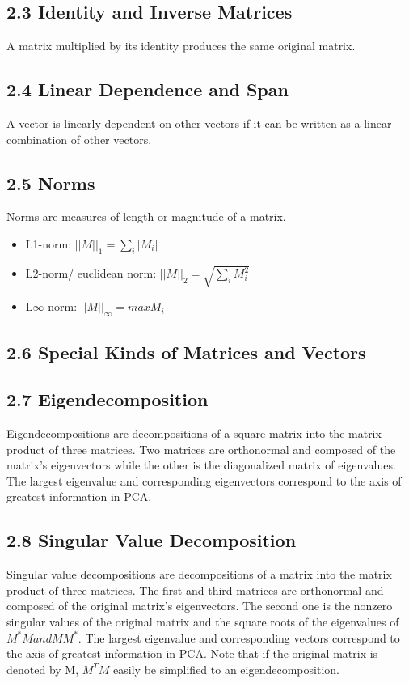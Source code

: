 \documentclass[a4paper]{report}
\begin{document}
\subsection{2.3 Identity and Inverse Matrices}
A matrix multiplied by its identity produces the same original matrix.

\subsection{2.4 Linear Dependence and Span}
A vector is linearly dependent on other vectors if it can be written as a linear combination of other vectors.

\subsection{2.5 Norms}
Norms are measures of length or magnitude of a matrix.
\begin{itemize}
    \item L1-norm: $||M||_1=\sum_i |M_i|$
    \item L2-norm/ euclidean norm: $||M||_2=\sqrt{\sum_i M_i^2}$
    \item L$\infty$-norm: $||M||_\infty=max{M_i}$
\end{itemize}

\subsection{2.6 Special Kinds of Matrices and Vectors}
\subsection{2.7 Eigendecomposition}
Eigendecompositions are decompositions of a square matrix into the matrix product of three matrices. Two matrices are orthonormal and composed of the matrix's eigenvectors while the other is the diagonalized matrix of eigenvalues. The largest eigenvalue and corresponding eigenvectors correspond to the axis of greatest information in PCA.
\subsection{2.8 Singular Value Decomposition}
Singular value decompositions are decompositions of a matrix into the matrix product of three matrices. The first and third matrices are orthonormal and composed of the original matrix's eigenvectors. The second one is the nonzero singular values of the original matrix and the square roots of the eigenvalues of $M^*M and MM^*$. The largest eigenvalue and corresponding vectors correspond to the axis of greatest information in PCA. Note that if the original matrix is denoted by M, $M^TM$ easily be simplified to an eigendecomposition.
\end{document}
